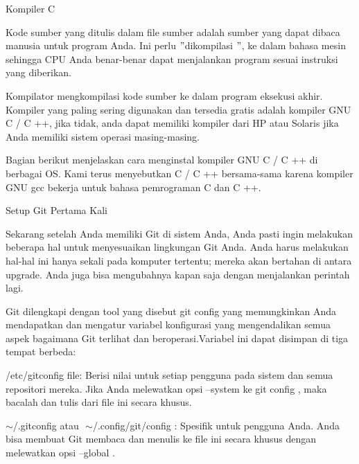 \vspace{12pt}
\noindent 
Kompiler C \par
\vspace{12pt}
\noindent 
Kode sumber yang ditulis dalam file sumber adalah sumber yang dapat dibaca manusia untuk program Anda. Ini perlu  $ " $dikompilasi $ " $, ke dalam bahasa mesin sehingga CPU Anda benar-benar dapat menjalankan program sesuai instruksi yang diberikan. \par
\vspace{12pt}
\noindent 
Kompilator mengkompilasi kode sumber ke dalam program eksekusi akhir. Kompiler yang paling sering digunakan dan tersedia gratis adalah kompiler GNU C / C ++, jika tidak, anda dapat memiliki kompiler dari HP atau Solaris jika Anda memiliki sistem operasi masing-masing. \par
\vspace{12pt}
\noindent 
Bagian berikut menjelaskan cara menginstal kompiler GNU C / C ++ di berbagai OS. Kami terus menyebutkan C / C ++ bersama-sama karena kompiler GNU gcc bekerja untuk bahasa pemrograman C dan C ++. \par
\noindent 
Setup Git Pertama Kali \par
\vspace{12pt}
\noindent 
Sekarang setelah Anda memiliki Git di sistem Anda, Anda pasti ingin melakukan beberapa hal untuk menyesuaikan lingkungan Git Anda. $  $Anda harus melakukan hal-hal ini hanya sekali pada komputer tertentu; $  $mereka akan bertahan di antara upgrade. $  $Anda juga bisa mengubahnya kapan saja dengan menjalankan perintah lagi. \par
\vspace{12pt}
\noindent 
Git dilengkapi dengan tool yang disebut $  $git config $  $yang memungkinkan Anda mendapatkan dan mengatur variabel konfigurasi yang mengendalikan semua aspek bagaimana Git terlihat dan beroperasi.Variabel ini dapat disimpan di tiga tempat berbeda: \par
\vspace{12pt}
\noindent 
/etc/gitconfig $  $file: Berisi nilai untuk setiap pengguna pada sistem dan semua repositori mereka. $  $Jika Anda melewatkan opsi $  $--system $  $ke $  $git config $  $, maka bacalah dan tulis dari file ini secara khusus. \par
\vspace{12pt}
\noindent 
 $  \sim  $/.gitconfig $  $atau $  $ $  \sim  $/.config/git/config $  $: Spesifik untuk pengguna Anda. $  $Anda bisa membuat Git membaca dan menulis ke file ini secara khusus dengan melewatkan opsi $  $--global $  $. \par
